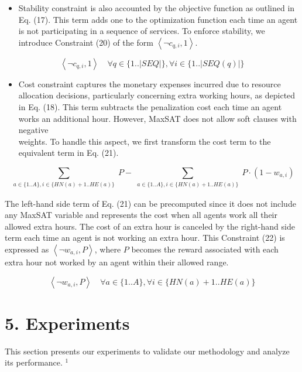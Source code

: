 \documentclass[10pt]{article}
\begin{document}
\begin{itemize}
  \item Stability constraint is also accounted by the objective function as outlined in Eq. (17). This term adds one to the optimization function each time an agent is not participating in a sequence of services. To enforce stability, we introduce Constraint (20) of the form $\left\langle\neg c_{q, i}, 1\right\rangle$.
\end{itemize}


\begin{equation*}
\left\langle\neg c_{q, i}, 1\right\rangle \quad \forall q \in\{1 . .|S E Q|\}, \forall i \in\{1 . .|S E Q(q)|\} \tag{20}
\end{equation*}


\begin{itemize}
  \item Cost constraint captures the monetary expenses incurred due to resource allocation decisions, particularly concerning extra working hours, as depicted in Eq. (18). This term subtracts the penalization cost each time an agent works an additional hour. However, MaxSAT does not allow soft clauses with negative\\
weights. To handle this aspect, we first transform the cost term to the equivalent term in Eq. (21).
\end{itemize}


\begin{equation*}
\sum_{\substack{a \in\{1 . . A\}, i \in\{H N(a)+1 . . H E(a)\}}} P-\sum_{\substack{a \in\{1 . . A\}, i \in\{H N(a)+1 . . H E(a)\}}} P \cdot\left(1-w_{a, i}\right) \tag{21}
\end{equation*}


The left-hand side term of Eq. (21) can be precomputed since it does not include any MaxSAT variable and represents the cost when all agents work all their allowed extra hours. The cost of an extra hour is canceled by the right-hand side term each time an agent is not working an extra hour. This Constraint (22) is expressed as $\left\langle\neg w_{a, i}, P\right\rangle$, where $P$ becomes the reward associated with each extra hour not worked by an agent within their allowed range.


\begin{equation*}
\left\langle\neg w_{a, i}, P\right\rangle \quad \forall a \in\{1 . . A\}, \forall i \in\{H N(a)+1 . . H E(a)\} \tag{22}
\end{equation*}


\section*{5. Experiments}
This section presents our experiments to validate our methodology and analyze its performance. ${ }^{1}$
\end{document}
